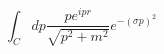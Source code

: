 \documentclass{minimal}
\begin{document}
$$\int_C dp \frac{p e^{ipr}}{\sqrt{p^2 + m^2}} e^{-(\sigma p)^2}$$
\end{document}
